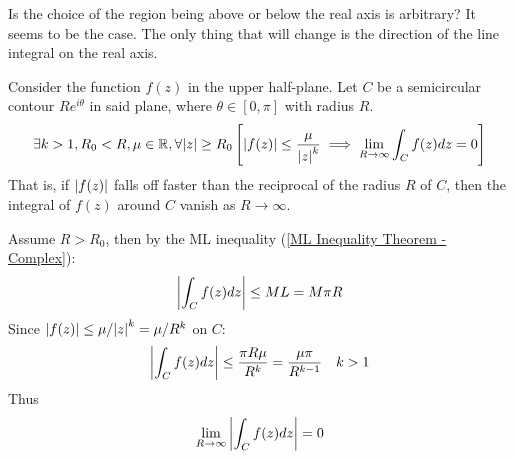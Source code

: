 \documentclass[12pt, english]{book}
\makeatletter
\renewenvironment{proof}[1][\proofname]{\par
	\pushQED{\qed}%
	\normalfont \topsep6\p@\@plus6\p@\relax
	\list{}{%
		\settowidth{\leftmargin}{\itshape\proofname:\hskip\labelsep}%
		\setlength{\labelwidth}{0pt}%
		\setlength{\itemindent}{-\leftmargin}%
		}%
	\item[\hskip\labelsep\itshape#1\@addpunct{:}]\ignorespaces
	}{\popQED\endlist\@endpefalse}
\makeatother
\begin{document}
	\begin{question}
		Is the choice of the region being above or below the real axis is arbitrary? It seems to be the case. The only thing that will change is the direction of the line integral on the real axis.
	\end{question}

	\begin{theorem}
		Consider the function \(f(z)\) in the upper half-plane. Let \(C\) be a semicircular contour \(Re^{i\theta}\) in said plane, where \(\theta \in [0, \pi]\) with radius \(R\). 
		\begin{align*}
			\exists k>1, R_0<R, \mu \in \mathbb{R}, \forall \abs{z} \geq R_0 
			\left[\abs{f(z)} \leq \frac{\mu}{\abs{z}^k} 
			\implies \lim_{R\rightarrow \infty} \int_{C} f(z) dz = 0\right]
		\end{align*}
		That is, if \(\abs{f(z)}\) falls off faster than the reciprocal of the radius \(R\) of \(C\), then the integral of \(f(z)\) around \(C\) vanish as \(R \rightarrow \infty\).
	\end{theorem}
	\begin{proof}
		Assume \(R > R_0\), then by the ML inequality (\cref{ML Inequality Theorem - Complex}):
		\begin{align*}
			\abs{\int_{C} f(z) dz} \leq ML = M\pi R
		\end{align*}
		Since \(\abs{f(z)} \leq \mu / \abs{z}^k = \mu/ R^k\) on \(C\):
		\begin{align*}
			\abs{\int_{C} f(z) dz} &\leq \frac{\pi R \mu}{R^k} = \frac{\mu \pi}{R^{k-1}} & k>1
		\end{align*}
		Thus 
		\begin{align*}
			\lim_{R\rightarrow \infty} \abs{\int_{C} f(z) dz} = 0
		\end{align*}
	\end{proof}
\end{document}
